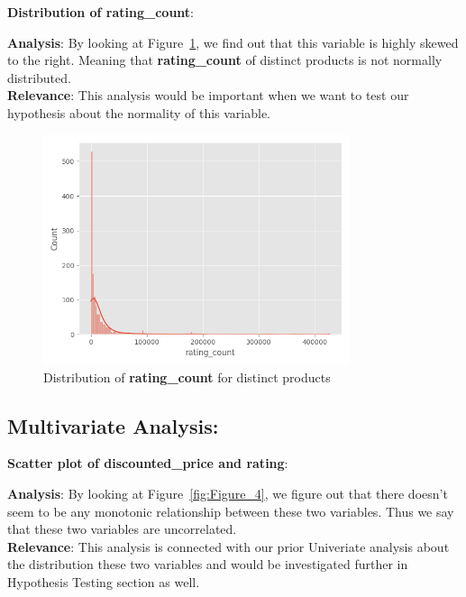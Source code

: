 \documentclass[a4paper,12pt]{article}
\begin{document}
\noindent\textbf{Distribution of rating\_count}:

\noindent\textbf{Analysis}: By looking at Figure~\ref{fig:Figure_3}, we find out that this variable is highly skewed to the right. Meaning that \textbf{rating\_count} of distinct products is not normally distributed. \\

\noindent\textbf{Relevance}: This analysis would be important when we want to test our hypothesis about the normality of this variable.\\

\begin{figure}[H]
    \centering
    \includegraphics[width=0.8\textwidth]{./images/distribution_of_rating_count_for_products.png} %
    \caption{Distribution of \textbf{rating\_count} for distinct products}
    \label{fig:Figure_3}
\end{figure}


\subsection*{Multivariate Analysis:}

\noindent\textbf{Scatter plot of discounted\_price and rating}:

\noindent\textbf{Analysis}: By looking at Figure~\ref{fig:Figure_4}, we figure out that there doesn't seem to be any monotonic relationship between these two variables. Thus we say that these two variables are uncorrelated. \\

\noindent\textbf{Relevance}: This analysis is connected with our prior Univeriate analysis about the distribution these two variables and would be investigated further in Hypothesis Testing section as well. \\
\end{document}
